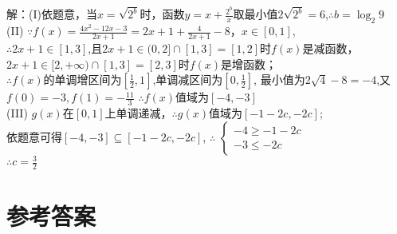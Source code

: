 \begin{exercise}
\begin{answer}
  解：(I)依题意，当$x=\sqrt{2^b}$时，函数$y=x+\frac{2^b}x$取最小值$2\sqrt{2^b}=6$,$\therefore b=\log_2 9$\\
  (II) $\because f(x)=\frac{4x^2-12x-3}{2x+1}=2x+1+\frac{4}{2x+1}-8，x\in [0,1]$, \\
  $\therefore 2x+1\in[1,3]$,且$2x+1\in(0,2]\cap [1,3]=[1,2]$时$f(x)$是减函数，$2x+1\in[2,+\infty)\cap [1,3]=[2,3]$时$f(x)$是增函数；\\
  $\therefore$$f(x)$的单调增区间为$[\frac12,1]$,单调减区间为$[0,\frac12]$,
  最小值为$2\sqrt4-8=-4$,又$f(0)=-3,f(1)=-\frac{11}3$
  $\therefore f(x)$值域为$[-4,-3]$\\
  (III) $g(x)$在$[0,1]$上单调递减，$\therefore g(x)$值域为$[-1-2c,-2c]$;\\
  依题意可得$[-4,-3]\subseteq[-1-2c,-2c]$,
  $\therefore$
  $\begin{cases}
    -4\geq -1-2c\\
    -3\leq -2c
  \end{cases}$\\
  $\therefore c=\frac32$
\end{answer}
\end{exercise}
\stopexercise
\hspace{2em}
\newpage
\part{参考答案}
\printanswer
